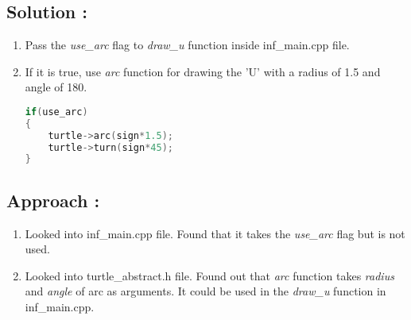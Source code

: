 \documentclass[12pt]{article}
\begin{document}

\subsection{Solution :}
\begin{enumerate}
\item Pass the \textit{use\_arc} flag to \textit{draw\_u} function inside inf\_main.cpp file.
\item If it is true, use \textit{arc} function for drawing the 'U' with a radius of 1.5 and angle of 180.
\begin{lstlisting}[language=c++]
if(use_arc)
{
    turtle->arc(sign*1.5);
    turtle->turn(sign*45);
}
\end{lstlisting}
\end{enumerate}

\subsection{Approach :}
\begin{enumerate}
\item Looked into inf\_main.cpp file. Found that it takes the \textit{use\_arc} flag but is not used.
\item Looked into turtle\_abstract.h file. Found out that \textit{arc} function takes \textit{radius} and \textit{angle} of arc as arguments. It could be used in the \textit{draw\_u} function in inf\_main.cpp.
\end{enumerate}
\end{document}
